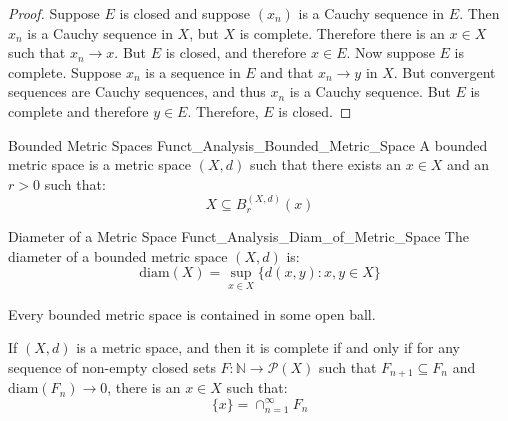             \begin{proof}
                Suppose $E$ is closed and suppose $(x_{n})$ is a
                Cauchy sequence in $E$. Then $x_{n}$ is a Cauchy
                sequence in $X$, but $X$ is complete. Therefore
                there is an $x\in{X}$ such that
                $x_{n}\rightarrow{x}$. But $E$ is closed,
                and therefore $x\in{E}$. Now suppose $E$ is
                complete. Suppose $x_{n}$ is a sequence in $E$
                and that $x_{n}\rightarrow{y}$ in $X$. But
                convergent sequences are Cauchy sequences, and
                thus $x_{n}$ is a Cauchy sequence. But $E$ is
                complete and therefore $y\in{E}$.
                Therefore, $E$ is closed.
            \end{proof}
            \begin{ldefinition}{Bounded Metric Spaces}
                  {Funct_Analysis_Bounded_Metric_Space}
                A bounded metric space is a metric space
                $(X,d)$ such that there exists an $x\in{X}$
                and an $r>0$ such that:
                \begin{equation}
                    X\subseteq{B}_{r}^{(X,d)}(x)
                \end{equation}
            \end{ldefinition}
            \begin{ldefinition}{Diameter of a Metric Space}
                  {Funct_Analysis_Diam_of_Metric_Space}
                The diameter of a bounded metric space $(X,d)$ is:
                \begin{equation}
                    \mathrm{diam}(X)=\sup_{x\in{X}}\{d(x,y):x,y\in{X}\}
                \end{equation}
            \end{ldefinition}
            Every bounded metric space is contained in some
            open ball.
            \begin{theorem}
                If $(X,d)$ is a metric space, and then it
                is complete if and only if for any sequence
                of non-empty closed sets
                $F:\mathbb{N}\rightarrow\mathcal{P}(X)$ such that
                $F_{n+1}\subseteq{F}_{n}$ and
                $\mathrm{diam}(F_{n})\rightarrow{0}$,
                there is an $x\in{X}$ such that:
                \begin{equation}
                    \{x\}=\cap_{n=1}^{\infty}F_{n}
                \end{equation}
            \end{theorem}
